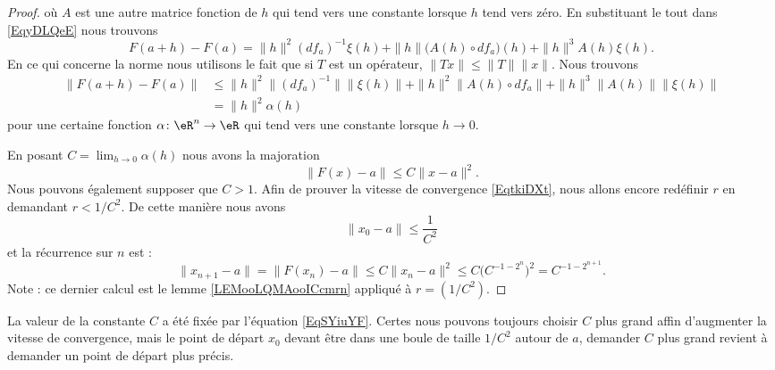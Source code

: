 \begin{proof}
        où \( A\) est une autre matrice fonction de \(h\) qui tend vers une constante lorsque \( h\) tend vers zéro. En substituant le tout dans \eqref{EqyDLQeE} nous trouvons
        \begin{equation}
            F(a+h)-F(a)=\| h \|^2(df_a)^{-1}\xi(h)+\| h \|\big( A(h)\circ df_a \big)(h)+\| h \|^3A(h)\xi(h).
        \end{equation}
        En ce qui concerne la norme nous utilisons le fait que si \( T\) est un opérateur, \( \| Tx \|\leq \| T \|\| x \|\). Nous trouvons
        \begin{subequations}
            \begin{align}
                \| F(a+h)-F(a) \|&\leq \| h \|^2\| (df_a)^{-1} \|\| \xi(h) \|+\| h \|^2\| A(h)\circ df_a \|+\| h \|^3\| A(h) \|\| \xi(h) \|\\
                &=\| h \|^2\alpha(h)
            \end{align}
        \end{subequations}
    pour une certaine fonction \( \alpha\colon \eR^n\to \eR\) qui tend vers une constante lorsque \( h\to 0\). 

    En posant \( C=\lim_{h\to 0}\alpha(h) \) nous avons la majoration
    \begin{equation}        \label{EqSYiuYF}
        \| F(x)-a \|\leq C\| x-a \|^2.
    \end{equation}
    Nous pouvons également supposer que \( C>1\). Afin de prouver la vitesse de convergence \eqref{EqtkiDXt}, nous allons encore redéfinir \( r\) en demandant \( r<1/C^2\). De cette manière nous avons
    \begin{equation}
        \| x_0-a \|\leq \frac{1}{ C^2 }
    \end{equation}
    et la récurrence sur \( n\) est :
    \begin{equation}
        \| x_{n+1}-a \|=\| F(x_n)-a \|\leq C\| x_n-a \|^2\leq C\big( C^{-1-2^n} \big)^2=C^{-1-2^{n+1}}.
    \end{equation}
    Note : ce dernier calcul est le lemme \ref{LEMooLQMAooICcmrn} appliqué à \( r=(1/C^2)\).
\end{proof}

\begin{remark}
    La valeur de la constante \( C\) a été fixée par l'équation \eqref{EqSYiuYF}. Certes nous pouvons toujours choisir \( C\) plus grand affin d'augmenter la vitesse de convergence, mais le point de départ \( x_0\) devant être dans une boule de taille \( 1/C^2\) autour de \( a\), demander \( C \) plus grand revient à demander un point de départ plus précis.
\end{remark}


